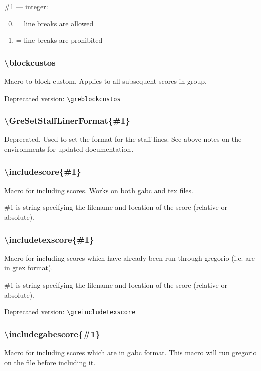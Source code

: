 \noindent\#1 --- integer: 
\begin{enumerate}[label=\arabic* =]\setcounter{enumi}{-1}
 \item = line breaks are allowed
 \item = line breaks are prohibited
\end{enumerate}

\subsubsection*{\textbackslash blockcustos}
Macro to block custom.  Applies to all subsequent scores in group.

\smallskip\indent Deprecated version: \verb=\greblockcustos=

\subsubsection*{\textbackslash GreSetStaffLinerFormat\{\#1\}}
Deprecated.  Used to set the format for the staff lines.  See above
notes on the environments for updated documentation.

\subsubsection*{\textbackslash includescore\{\#1\}}
Macro for including scores.  Works on both gabc and tex files.

\#1 is string specifying the filename and location of the score
(relative or absolute).

\subsubsection*{\textbackslash includetexscore\{\#1\}}
Macro for including scores which have already been run through
gregorio (i.e. are in gtex format).

\#1 is string specifying the filename and location of the score
(relative or absolute).

\smallskip\indent Deprecated version: \verb=\greincludetexscore=

\subsubsection*{\textbackslash includegabescore\{\#1\}}
Macro for including scores which are in gabc format.  This macro will
run gregorio on the file before including it.

